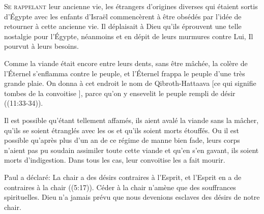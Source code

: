 \dvrule







\lettrine{S}{e rappelant} leur ancienne vie,
 les étrangers d'origines diverses qui étaient sortis d'Égypte
 avec les enfants d'Israël commencèrent à être obsédés
 par l'idée de retourner à cette ancienne vie.
 Il déplaisait à Dieu qu'ils éprouvent une telle nostalgie pour l'Égypte,
 néanmoins et en dépit de leurs murmures contre Lui,
 Il pourvut à leurs besoins.

\Og Comme la viande était encore entre leurs dents, sans être mâchée,
 la colère de l'Éternel s'enflamma contre le peuple, et l'Éternel
 frappa le peuple d'une très grande plaie.
 On donna à cet endroit le nom de Qibroth-Hattaava
 [ce qui signifie \Og tombes de la convoitise \Fg{}],
 parce qu'on y ensevelit le peuple rempli de désir \Fg{}
 ((11:33-34)).

Il est possible qu'étant tellement affamés,
 ils aient avalé la viande sans la mâcher,
 qu'ils se soient étranglés avec les os et qu'ils soient morts étouffés.
 Ou il est possible qu'après plus d'un an de ce régime de manne bien fade,
 leurs corps n'aient pas pu soudain assimiler toute cette viande
 et qu'en s'en gavant, ils soient morts d'indigestion.
 Dans tous les cas, leur convoitise les a fait mourir.


Paul a déclaré:
 \Og La chair a des désirs contraires à l'Esprit,
 et l'Esprit en a de contraires à la chair \Fg{} ((5:17)).
 Céder à la chair n'amène que des souffrances spirituelles.
 Dieu n'a jamais prévu que nous devenions esclaves des désirs de notre chair.

